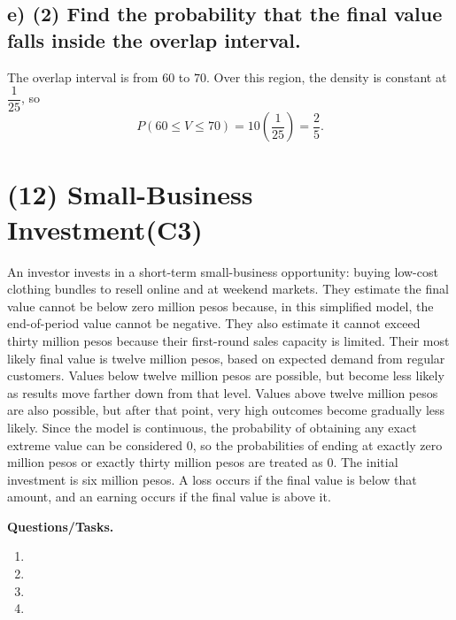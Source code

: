 	
	\subsection*{e) \textbf{(2)} Find the probability that the final value falls inside the overlap interval.}
	\label{subsec:two-scenario-inventory-investment-c2-e}
	The overlap interval is from $60$ to $70$. Over this region, the density is constant at $\dfrac{1}{25}$, so
	\[
	P(60\le V\le 70)=10\left(\frac{1}{25}\right)=\frac{2}{5}.
	\]
	
	
	\section{(12) Small-Business Investment(C3)}
	\label{sec:small-business-investment-c3}
	
	An investor invests in a short-term small-business opportunity: buying low-cost clothing bundles to resell online and at weekend markets. They estimate the final value cannot be below zero million pesos because, in this simplified model, the end-of-period value cannot be negative. They also estimate it cannot exceed thirty million pesos because their first-round sales capacity is limited. Their most likely final value is twelve million pesos, based on expected demand from regular customers. Values below twelve million pesos are possible, but become less likely as results move farther down from that level. Values above twelve million pesos are also possible, but after that point, very high outcomes become gradually less likely. Since the model is continuous, the probability of obtaining any exact extreme value can be considered $0$, so the probabilities of ending at exactly zero million pesos or exactly thirty million pesos are treated as $0$. The initial investment is six million pesos. A loss occurs if the final value is below that amount, and an earning occurs if the final value is above it.
	
	\textbf{Questions/Tasks.}
	\begin{enumerate}[label=\textbf{\alph*)}]
		\item {}
		\item {}
		\item {}
		\item {}
	\end{enumerate}
	
